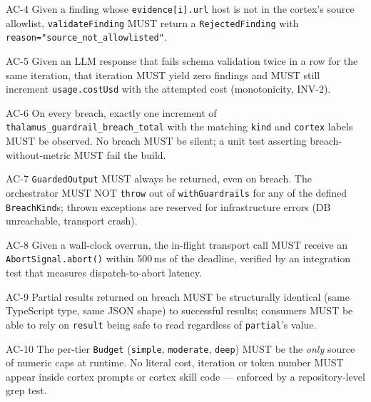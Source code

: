 \begin{ac}{AC-4}
Given a finding whose \texttt{evidence[i].url} host is not in the cortex's source allowlist, \texttt{validateFinding} MUST return a \texttt{RejectedFinding} with \texttt{reason="source\_not\_allowlisted"}.
\end{ac}

\begin{ac}{AC-5}
Given an LLM response that fails schema validation twice in a row for the same iteration, that iteration MUST yield zero findings and MUST still increment \texttt{usage.costUsd} with the attempted cost (monotonicity, INV-2).
\end{ac}

\begin{ac}{AC-6}
On every breach, exactly one increment of \texttt{thalamus\_guardrail\_breach\_total} with the matching \texttt{kind} and \texttt{cortex} labels MUST be observed. No breach MUST be silent; a unit test asserting breach-without-metric MUST fail the build.
\end{ac}

\begin{ac}{AC-7}
\texttt{GuardedOutput} MUST always be returned, even on breach. The orchestrator MUST NOT \texttt{throw} out of \texttt{withGuardrails} for any of the defined \texttt{BreachKind}s; thrown exceptions are reserved for infrastructure errors (DB unreachable, transport crash).
\end{ac}

\begin{ac}{AC-8}
Given a wall-clock overrun, the in-flight transport call MUST receive an \texttt{AbortSignal.abort()} within 500\,ms of the deadline, verified by an integration test that measures dispatch-to-abort latency.
\end{ac}

\begin{ac}{AC-9}
Partial results returned on breach MUST be structurally identical (same TypeScript type, same JSON shape) to successful results; consumers MUST be able to rely on \texttt{result} being safe to read regardless of \texttt{partial}'s value.
\end{ac}

\begin{ac}{AC-10}
The per-tier \texttt{Budget} (\texttt{simple}, \texttt{moderate}, \texttt{deep}) MUST be the \emph{only} source of numeric caps at runtime. No literal cost, iteration or token number MUST appear inside cortex prompts or cortex skill code --- enforced by a repository-level grep test.
\end{ac}

